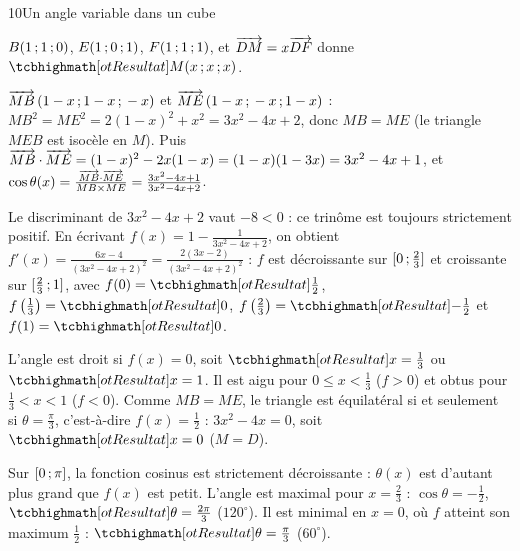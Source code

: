 \corrigesSouples
\begin{corrige}{10}{Un angle variable dans un cube}
\begin{questions}
  \item $B(1\,{;}\,1\,{;}\,0)$, $E(1\,{;}\,0\,{;}\,1)$, $F(1\,{;}\,1\,{;}\,1)$, et $\overrightarrow{DM}=x\overrightarrow{DF}$ donne $\res{M(x\pv x\pv x)}$.
  \item $\overrightarrow{MB}\,(1-x\,{;}\,1-x\,{;}\,-x)$ et $\overrightarrow{ME}\,(1-x\,{;}\,-x\,{;}\,1-x)$ : $MB^2=ME^2=2(1-x)^2+x^2=3x^2-4x+2$, donc $MB=ME$ (le
    triangle $MEB$ est isocèle en $M$). Puis $\overrightarrow{MB}\cdot\overrightarrow{ME}=(1-x)^2-2x(1-x)=(1-x)(1-3x)=3x^2-4x+1$, et
    $\cos\theta(x)=\frac{\overrightarrow{MB}\cdot\overrightarrow{ME}}{MB\times ME}=\frac{3x^2-4x+1}{3x^2-4x+2}$.
  \item Le discriminant de $3x^2-4x+2$ vaut $-8<0$ : ce trinôme est toujours strictement positif. En écrivant
    $f(x)=1-\frac{1}{3x^2-4x+2}$, on obtient $f'(x)=\frac{6x-4}{(3x^2-4x+2)^2}=\frac{2(3x-2)}{(3x^2-4x+2)^2}$ : $f$ est décroissante
    sur $\mathopen{[}0\,{;}\,\frac23\mathclose{]}$ et croissante sur $\mathopen{[}\frac23\,{;}\,1\mathclose{]}$, avec $f(0)=\res{\tfrac12}$, $f\left(\tfrac13\right)=\res{0}$,
    $f\left(\tfrac23\right)=\res{-\tfrac12}$ et $f(1)=\res{0}$.
  \item L'angle est droit si $f(x)=0$, soit $\res{x=\tfrac13}$ ou $\res{x=1}$. Il est aigu pour $0\leq x<\frac13$ ($f>0$) et obtus pour
    $\frac13<x<1$ ($f<0$). Comme $MB=ME$, le triangle est équilatéral si et seulement si $\theta=\frac{\pi}3$, c'est-à-dire
    $f(x)=\frac12$ : $3x^2-4x=0$, soit $\res{x=0}$ ($M=D$).
  \item Sur $\mathopen{[}0\,{;}\,\pi\mathclose{]}$, la fonction cosinus est strictement décroissante : $\theta(x)$ est d'autant plus grand que $f(x)$ est petit.
    L'angle est maximal pour $x=\frac23$ : $\cos\theta=-\frac12$, $\res{\theta=\tfrac{2\pi}{3}}$ ($120^\circ$). Il est minimal en
    $x=0$, où $f$ atteint son maximum $\frac12$ : $\res{\theta=\tfrac{\pi}{3}}$ ($60^\circ$).
\end{questions}
\end{corrige}

